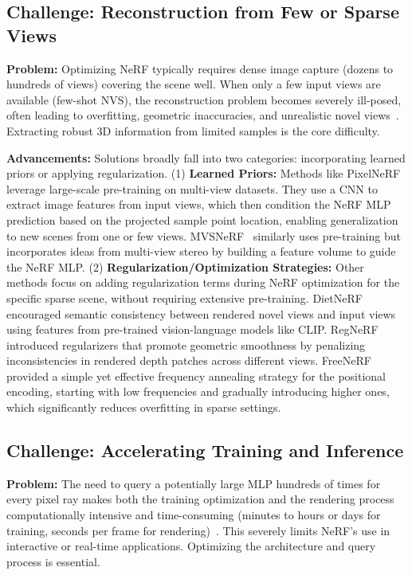 \subsection{Challenge: Reconstruction from Few or Sparse Views}
\label{subsec:sparse_challenge_revised}

\textbf{Problem:} Optimizing NeRF typically requires dense image capture (dozens to hundreds of views) covering the scene well. When only a few input views are available (few-shot NVS), the reconstruction problem becomes severely ill-posed, often leading to overfitting, geometric inaccuracies, and unrealistic novel views~\cite{yu2021pixelnerf, niemeyer2022regnerf}. Extracting robust 3D information from limited samples is the core difficulty.

\textbf{Advancements:} Solutions broadly fall into two categories: incorporating learned priors or applying regularization.
(1) \textbf{Learned Priors:} Methods like PixelNeRF~\cite{yu2021pixelnerf} leverage large-scale pre-training on multi-view datasets. They use a CNN to extract image features from input views, which then condition the NeRF MLP prediction based on the projected sample point location, enabling generalization to new scenes from one or few views. MVSNeRF~\cite{chen2021mvsnerf} similarly uses pre-training but incorporates ideas from multi-view stereo by building a feature volume to guide the NeRF MLP.
(2) \textbf{Regularization/Optimization Strategies:} Other methods focus on adding regularization terms during NeRF optimization for the specific sparse scene, without requiring extensive pre-training. DietNeRF~\cite{jain2021dietnerf} encouraged semantic consistency between rendered novel views and input views using features from pre-trained vision-language models like CLIP. RegNeRF~\cite{niemeyer2022regnerf} introduced regularizers that promote geometric smoothness by penalizing inconsistencies in rendered depth patches across different views. FreeNeRF~\cite{yang2023freenerf} provided a simple yet effective frequency annealing strategy for the positional encoding, starting with low frequencies and gradually introducing higher ones, which significantly reduces overfitting in sparse settings.

\subsection{Challenge: Accelerating Training and Inference}
\label{subsec:acceleration_challenge_revised}

\textbf{Problem:} The need to query a potentially large MLP hundreds of times for every pixel ray makes both the training optimization and the rendering process computationally intensive and time-consuming (minutes to hours or days for training, seconds per frame for rendering)~\cite{mueller2022instant, chen2022tensorf}. This severely limits NeRF's use in interactive or real-time applications. Optimizing the architecture and query process is essential.

